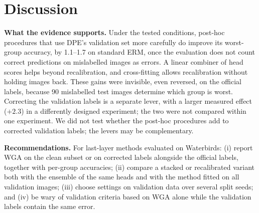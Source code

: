 \begin{table}[t]
\centering\small
\caption{Replication on four fresh ERM backbones with the authors' code (seeds 5--8, three head seeds each): test WGA (\%) by training and validation label set in the three test views, and the declared primary contrast (95\% interval over four backbones).}
\label{tab:replication}
\end{table}

\section{Discussion}
\textbf{What the evidence supports.} Under the tested conditions, post-hoc procedures that use DPE's validation set more carefully do improve its worst-group accuracy, by 1.1--1.7\pp{} on standard ERM, once the evaluation does not count correct predictions on mislabelled images as errors. A linear combiner of head scores helps beyond recalibration, and cross-fitting allows recalibration without holding images back. These gains were invisible, even reversed, on the official labels, because 90 mislabelled test images determine which group is worst. Correcting the validation labels is a separate lever, with a larger measured effect ($+2.3$\pp) in a differently designed experiment; the two were not compared within one experiment. We did not test whether the post-hoc procedures add to corrected validation labels; the levers may be complementary.

\textbf{Recommendations.} For last-layer methods evaluated on Waterbirds: (i) report WGA on the clean subset or on corrected labels alongside the official labels, together with per-group accuracies; (ii) compare a stacked or recalibrated variant both with the ensemble of the same heads and with the method fitted on all validation images; (iii) choose settings on validation data over several split seeds; and (iv) be wary of validation criteria based on WGA alone while the validation labels contain the same error.

